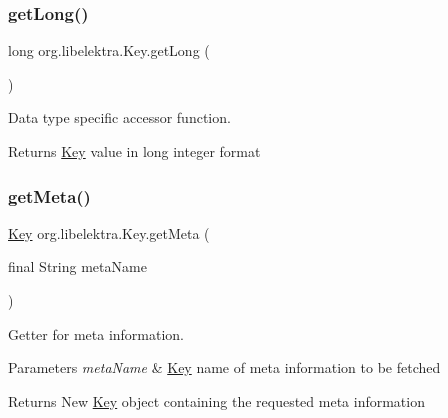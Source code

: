 \subsubsection{\texorpdfstring{getLong()}{getLong()}}
{\footnotesize\ttfamily long org.\+libelektra.\+Key.\+get\+Long (\begin{DoxyParamCaption}{ }\end{DoxyParamCaption})\hspace{0.3cm}{\ttfamily [inline]}}



Data type specific accessor function. 

\begin{DoxyReturn}{Returns}
\mbox{\hyperlink{classorg_1_1libelektra_1_1Key}{Key}} value in long integer format 
\end{DoxyReturn}
\mbox{\label{classorg_1_1libelektra_1_1Key_a49d5d04f67917075c7b1513249777ccf}} 
\subsubsection{\texorpdfstring{getMeta()}{getMeta()}}
{\footnotesize\ttfamily \mbox{\hyperlink{classorg_1_1libelektra_1_1Key}{Key}} org.\+libelektra.\+Key.\+get\+Meta (\begin{DoxyParamCaption}\item[{final String}]{meta\+Name }\end{DoxyParamCaption})\hspace{0.3cm}{\ttfamily [inline]}}



Getter for meta information. 


\begin{DoxyParams}{Parameters}
{\em meta\+Name} & \mbox{\hyperlink{classorg_1_1libelektra_1_1Key}{Key}} name of meta information to be fetched \\
\hline
\end{DoxyParams}
\begin{DoxyReturn}{Returns}
New \mbox{\hyperlink{classorg_1_1libelektra_1_1Key}{Key}} object containing the requested meta information 
\end{DoxyReturn}
\mbox{\label{classorg_1_1libelektra_1_1Key_a668626c8403940015ff5031cfa5e973c}} 
